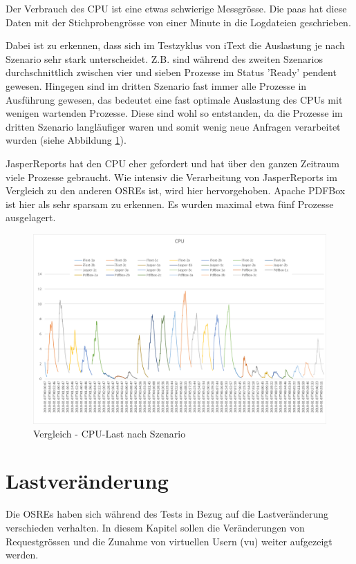 \documentclass[main.tex]{subfiles}
\begin{document}
Der Verbrauch des CPU ist eine etwas schwierige Messgrösse. Die \acrshort{paas} hat diese Daten mit der Stichprobengrösse von einer Minute in die Logdateien geschrieben.

Dabei ist zu erkennen, dass sich im Testzyklus von iText  die Auslastung je nach Szenario sehr stark unterscheidet. Z.B. sind während des zweiten Szenarios durchschnittlich zwischen vier und sieben Prozesse im Status 'Ready' pendent gewesen. Hingegen sind im dritten Szenario fast immer alle Prozesse in Ausführung gewesen, das bedeutet eine fast optimale Auslastung des CPUs mit wenigen wartenden Prozesse. Diese sind wohl so entstanden, da die Prozesse im dritten Szenario langläufiger waren und somit wenig neue Anfragen verarbeitet wurden (siehe Abbildung \ref{figure:cpuVergleich}).

JasperReports hat den CPU eher gefordert und hat über den ganzen Zeitraum viele Prozesse gebraucht. Wie intensiv die Verarbeitung von JasperReports im Vergleich zu den anderen OSREs ist, wird hier hervorgehoben. Apache PDFBox ist hier als sehr sparsam zu erkennen. Es wurden maximal etwa 
fünf Prozesse ausgelagert. 
\begin{figure}[H]
\includegraphics[width=\textwidth]{mainpart/4_analyse_img/CPUVergleich.png}
 \caption{Vergleich - CPU-Last nach Szenario}
 \label{figure:cpuVergleich}
\end{figure}


\section{Lastveränderung}

Die OSREs haben sich während des Tests in Bezug auf die Lastveränderung verschieden verhalten. In diesem Kapitel sollen die Veränderungen von Requestgrössen und die Zunahme von virtuellen Usern (\acrshort{vu}) weiter aufgezeigt werden.
\end{document}
